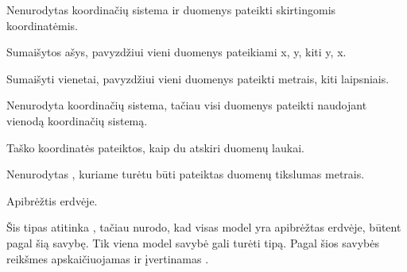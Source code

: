 \documentclass[letterpaper,10pt,lithuanian]{sphinxmanual}
\begin{document}
\begin{fulllineitems}
\begin{sphinxtopic}
\begin{description}
\sphinxAtStartPar
Nenurodytas koordinačių sistema ir duomenys pateikti skirtingomis
koordinatėmis.

\sphinxAtStartPar
Sumaišytos ašys, pavyzdžiui vieni duomenys pateikiami x, y, kiti y,
x.

\sphinxAtStartPar
Sumaišyti vienetai, pavyzdžiui vieni duomenys pateikti metrais,
kiti laipsniais.

\sphinxAtStartPar
Nenurodyta koordinačių sistema, tačiau visi duomenys pateikti
naudojant vienodą koordinačių sistemą.

\sphinxAtStartPar
Taško koordinatės pateiktos, kaip du atskiri duomenų laukai.

\sphinxAtStartPar
Nenurodytas {\hyperref[\detokenize{dimensijos:property.ref}]{}}, kuriame turėtu būti pateiktas
duomenų tikslumas metrais.

\end{description}
\end{sphinxtopic}

\end{fulllineitems}



\begin{fulllineitems}

\pysigstartsignatures
\pysigline
{}
\pysigstopsignatures
\sphinxAtStartPar
{}

\sphinxAtStartPar
Apibrėžtis erdvėje.

\sphinxAtStartPar
Šis tipas atitinka , tačiau nurodo, kad visas model yra
apibrėžtas erdvėje, būtent pagal šią savybę.  Tik viena model savybė
gali turėti  tipą. Pagal šios savybės reikšmes apskaičiuojamas ir
įvertinamas .

\end{fulllineitems}
\end{document}
